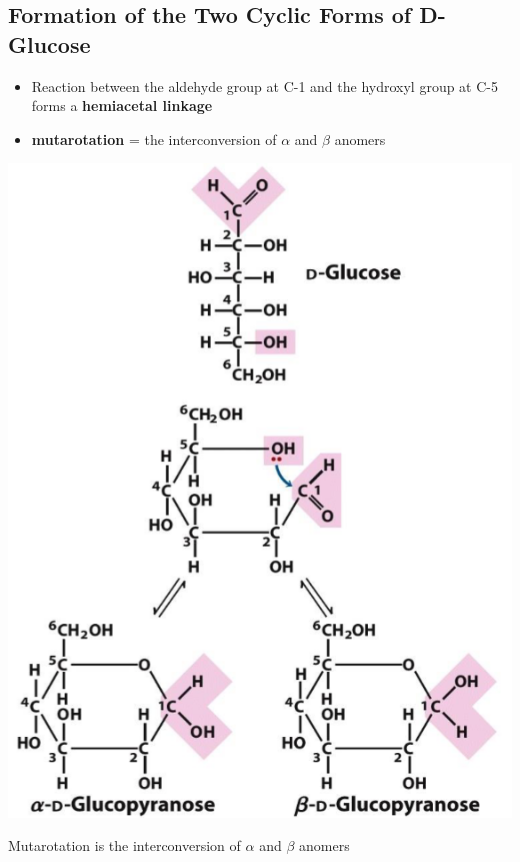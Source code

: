 \documentclass[10pt]{article}
\begin{document}
\subsection*{Formation of the Two Cyclic Forms of D-Glucose}
\begin{itemize}
    \item Reaction between the aldehyde group at C-1 and the hydroxyl group at C-5 forms a \textbf{hemiacetal linkage}
    \item \textbf{mutarotation} = the interconversion of $\alpha$ and $\beta$ anomers
\end{itemize}
\begin{center}
    \includegraphics*[scale=0.6]{L1_7.png}
\end{center}
Mutarotation is the interconversion of $\alpha$ and $\beta$ anomers
\end{document}

